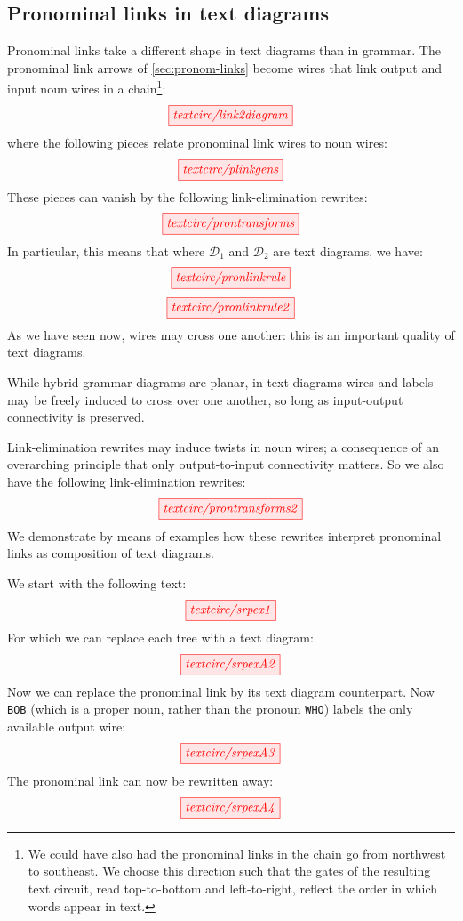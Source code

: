 \subsection{Pronominal links in text diagrams}\label{sec:prondiag}  

Pronominal links take a different shape in text diagrams than in grammar. %
The pronominal link arrows of \ref{sec:pronom-links} become wires that link output and input noun wires in a chain\footnote{We could have also had the pronominal links in the chain go from northwest to southeast. We choose this direction such that the gates of the resulting text circuit, read top-to-bottom and left-to-right, reflect the order in which words appear in text.}:
\[
\tikzfig{textcirc/link2diagram}
\]
where the following pieces relate pronominal link wires to noun wires:
\[
\tikzfig{textcirc/plinkgens}
\]
These pieces can vanish by the following link-elimination rewrites:
\[
\tikzfig{textcirc/prontransforms}  
\]
In particular, this means that where $\mathcal{D}_1$ and $\mathcal{D}_2$ are text diagrams, we have:
\[
\tikzfig{textcirc/pronlinkrule}  
\]  
\[
\tikzfig{textcirc/pronlinkrule2}
\]
As we have seen now, wires may cross one another: this is an important quality of text diagrams.
\begin{convention}\label{conv:onlyconnect}
While hybrid grammar diagrams are planar, in text diagrams wires and labels may be freely induced to cross over one another, so long as input-output connectivity is preserved.
\end{convention}
Link-elimination rewrites may induce twists in noun wires; a consequence of an overarching principle that only output-to-input connectivity matters. So we also have the following link-elimination rewrites:
\[
\tikzfig{textcirc/prontransforms2}  
\]
We demonstrate by means of examples how these rewrites interpret pronominal links as composition of text diagrams.  

\begin{example}
We start with the following text:
\[
\tikzfig{textcirc/srpex1}
\]
For which we can replace each tree with a text diagram:
\[
\tikzfig{textcirc/srpexA2}
\]
Now we can replace the pronominal link by its text diagram counterpart. Now \texttt{BOB} (which is a proper noun, rather than the pronoun \texttt{WHO}) labels the only available output wire:
\[
\tikzfig{textcirc/srpexA3}
\]
The pronominal link can now be rewritten away:
\[
\tikzfig{textcirc/srpexA4}
\]
\end{example}

